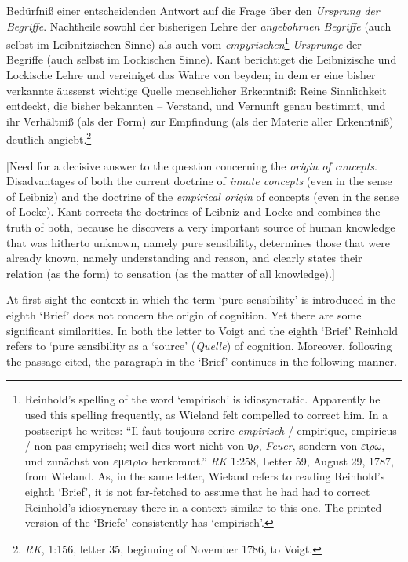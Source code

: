 Bed\"{u}rfni\ss{} einer entscheidenden Antwort auf die Frage \"{u}ber den \textit{Ursprung der Begriffe}. Nachtheile sowohl der bisherigen Lehre der \textit{angebohrnen Begriffe} (auch selbst im Leibnitzischen Sinne) als auch vom \textit{empyrischen}\footnote{ Reinhold's spelling of the word `empirisch' is idiosyncratic. Apparently he used this spelling frequently, as Wieland felt compelled to correct him. In a postscript he writes: ``Il faut toujours ecrire \textit{empirisch} / empirique, empiricus / non pas empyrisch; weil dies wort nicht von \pi υ\ensuremath{\rho}, \textit{Feuer}, sondern von \pi \ensuremath{\varepsilon}ι\ensuremath{\rho}\ensuremath{\omega}, und zun\"{a}chst von \ensuremath{\varepsilon}μ\pi \ensuremath{\varepsilon}ι\ensuremath{\rho}ι\ensuremath{\alpha} herkommt.'' \textit{RK} 1:258, Letter 59, August 29, 1787, from Wieland. As, in the same letter, Wieland refers to reading Reinhold's eighth `Brief', it is not far{-}fetched to assume that he had had to correct Reinhold's idiosyncrasy there in a context similar to this one. The printed version of the `Briefe' consistently has `empirisch'. }\textit{ Ursprunge} der Begriffe (auch selbst im Lockischen Sinne). Kant berichtiget die Leibnizische und Lockische Lehre und vereiniget das Wahre von beyden; in dem er eine bisher verkannte \"{a}usserst wichtige Quelle menschlicher Erkenntni\ss{}: Reine Sinnlichkeit entdeckt, die bisher bekannten {--} Verstand, und Vernunft genau bestimmt, und ihr Verh\"{a}ltni\ss{} (als der Form) zur Empfindung (als der Materie aller Erkenntni\ss{}) deutlich angiebt.\footnote{ \textit{RK}, 1:156, letter 35, beginning of November 1786, to Voigt. } 

[Need for a decisive answer to the question concerning the \textit{origin of concepts}. Disadvantages of both the current doctrine of \textit{innate concepts} (even in the sense of Leibniz) and the doctrine of the \textit{empirical origin }of concepts (even in the sense of Locke). Kant corrects the doctrines of Leibniz and Locke and combines the truth of both, because he discovers a very important source of human knowledge that was hitherto unknown, namely pure sensibility, determines those that were already known, namely understanding and reason, and clearly states their relation (as the form) to sensation (as the matter of all knowledge).]

At first sight the context in which the term `pure sensibility' is introduced in the eighth `Brief' does not concern the origin of cognition. Yet there are some significant similarities. In both the letter to Voigt and the eighth `Brief' Reinhold refers to `pure sensibility as a `source' (\textit{Quelle}) of cognition. Moreover, following the passage cited, the paragraph in the `Brief' continues in the following manner. 

